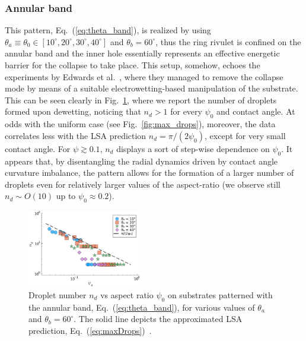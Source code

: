 \documentclass[%
 aip,
 amsmath,amssymb,
 reprint,%
]{revtex4-1}
\begin{document}
\subsubsection{Annular band}\label{subsubsec:banded}
This pattern, Eq.~(\ref{eq:theta_band}), is realized by using $\theta_a \equiv \theta_0 \in [10^{\circ}, 20^{\circ}, 30^{\circ}, 40^{\circ}]$ and $\theta_b = 60^{\circ}$, thus the ring rivulet is confined on the annular band and the inner hole essentially represents an effective energetic barrier for the collapse to take place.
This setup, somehow, echoes the experiments by Edwards et al.~\cite{edwardsControllingBreakupToroidal2021}, where they managed to remove the collapse mode by means of a suitable electrowetting-based manipulation of the substrate.
This can be seen clearly in Fig.~\ref{fig:max_drops_band}, where we report the number of droplets formed upon dewetting, noticing that $n_d>1$ for every $\psi_0$ and contact angle. 
At odds with the uniform case (see Fig.~\ref{fig:max_drops}), moreover, the data correlates less with the LSA prediction $n_d = \pi/(2\psi_0)$, except for very small contact angle. 
For $\psi \gtrsim 0.1$, $n_d$ displays a sort of step-wise dependence on $\psi_0$. 
It appears that, by disentangling the radial dynamics driven by contact angle curvature imbalance, the pattern allows for the formation of a larger number of droplets even for relatively larger values of the aspect-ratio (we observe still $n_d \sim O(10)$ up to $\psi_0 \approx 0.2$).
\begin{figure}
    \centering
    \includegraphics[width=0.45\textwidth]{Figure_5.pdf}    
    \caption{Droplet number $n_d$ vs aspect ratio $\psi_0$ on substrates patterned with the annular band, Eq.~(\ref{eq:theta_band}), for various values of $\theta_a$ and $\theta_b = 60^{\circ}$. 
    The solid line depicts the approximated LSA prediction, Eq.~(\ref{eq:maxDrops})~\cite{gonzalezStabilityLiquidRing2013}.}
    \label{fig:max_drops_band}
\end{figure}
\end{document}
